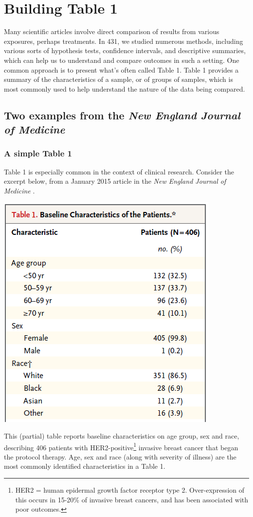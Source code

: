 \documentclass[]{book}
\let\rmarkdownfootnote\footnote%
\def\footnote{\protect\rmarkdownfootnote}
\theoremstyle{definition}
\theoremstyle{definition}
\theoremstyle{definition}
\theoremstyle{remark}
\begin{document}
\chapter{Building Table 1}\label{building-table-1}

Many scientific articles involve direct comparison of results from
various exposures, perhaps treatments. In 431, we studied numerous
methods, including various sorts of hypothesis tests, confidence
intervals, and descriptive summaries, which can help us to understand
and compare outcomes in such a setting. One common approach is to
present what's often called Table 1. Table 1 provides a summary of the
characteristics of a sample, or of groups of samples, which is most
commonly used to help understand the nature of the data being compared.

\section{\texorpdfstring{Two examples from the \emph{New England Journal
of
Medicine}}{Two examples from the New England Journal of Medicine}}\label{two-examples-from-the-new-england-journal-of-medicine}

\subsection{A simple Table 1}\label{a-simple-table-1}

Table 1 is especially common in the context of clinical research.
Consider the excerpt below, from a January 2015 article in the \emph{New
England Journal of Medicine} \citep{Tolaney2015}.

\includegraphics[width=0.5\linewidth]{images/Tolaney-snip1}

This (partial) table reports baseline characteristics on age group, sex
and race, describing 406 patients with HER2-positive\footnote{HER2 =
  human epidermal growth factor receptor type 2. Over-expression of this
  occurs in 15-20\% of invasive breast cancers, and has been associated
  with poor outcomes.} invasive breast cancer that began the protocol
therapy. Age, sex and race (along with severity of illness) are the most
commonly identified characteristics in a Table 1.
\end{document}
